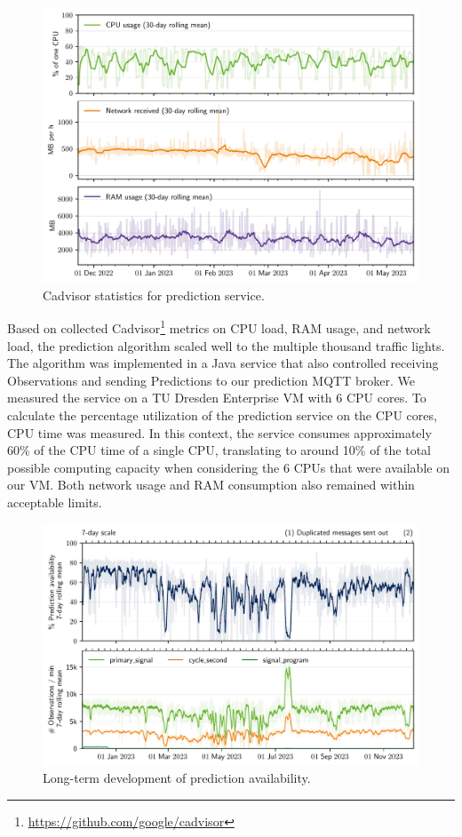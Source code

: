 \begin{figure}[t]
    \centering
    \includegraphics[width=\linewidth]{images/monitoring-prediction-service-load.pdf}
    \caption{Cadvisor statistics for prediction service.}\label{fig:monitoring-prediction-service-load}
\end{figure}

Based on collected Cadvisor\footnote{\url{https://github.com/google/cadvisor}} metrics on CPU load, RAM usage, and network load, the prediction algorithm scaled well to the multiple thousand traffic lights. The algorithm was implemented in a Java service that also controlled receiving Observations and sending Predictions to our prediction MQTT broker. We measured the service on a TU Dresden Enterprise VM with 6 CPU cores. To calculate the percentage utilization of the prediction service on the CPU cores, CPU time was measured. In this context, the service consumes approximately 60\% of the CPU time of a single CPU, translating to around 10\% of the total possible computing capacity when considering the 6 CPUs that were available on our VM. Both network usage and RAM consumption also remained within acceptable limits. 

\begin{figure}[t]
    \centering
    \includegraphics[width=\linewidth]{images/monitoring-availability.pdf}
    \caption{Long-term development of prediction availability.}\label{fig:monitoring-availability}
\end{figure}


